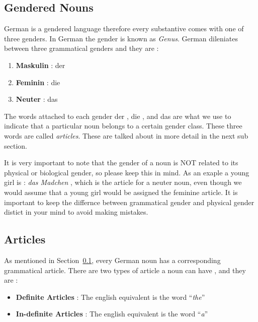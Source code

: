 \documentclass[a4paper,twocolumn,10pt]{article}
\newcommand{\newpar}
{\par \vspace{0.3cm}}
\newcommand{\subsectionend}
{
\nolinenumbers
\linenumbers
}
\begin{document}
\subsection{Gendered Nouns}
\label{ssec:gendered_nouns}

German is a gendered language therefore every substantive comes with one of
three genders. In German the gender is known as \textit{Genus}. German
dileniates between three grammatical genders and they are :

\nolinenumbers
\begin{enumerate}[noitemsep]
	\item \textbf{Maskulin }: der
	\item \textbf{Feminin} : die
	\item \textbf{Neuter}  : das
\end{enumerate}
\linenumbers

The words attached to each gender der , die , and das are what we use to
indicate that a particular noun belongs to a certain gender class. These three
words are called \textit{articles}. These are talked about in more detail in the
next sub section.\newpar

It is very important to note that the gender of a noun is NOT related to its
physical or biological gender, so please keep this in mind. As an exaple a young
girl is : \textit{das Madchen} , which is the article for a neuter noun, even
though we would assume that a young girl would be assigned the feminine article.
It is important to keep the differnce between grammatical gender and physical
gender distict in your mind to avoid making mistakes.


\subsectionend

\subsection{Articles}
\label{ssec:articles}

As mentioned in Section~\ref{ssec:gendered_nouns}, every German noun has a corresponding
grammatical article. There are two types of article a noun can have  , and they
are :

\nolinenumbers
\begin{itemize}[noitemsep]
	\item \textbf{Definite Articles} : The english equivalent is the word ``{\textit{the}}''
	\item \textbf{In-definite Articles} : The english equivalent is the word ``{\textit{a}}''
\end{itemize}
\linenumbers
\end{document}

